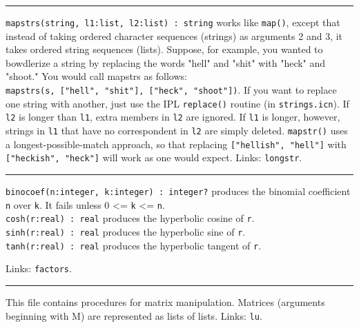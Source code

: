 \vspace{0.25cm}\hrule{}

\texttt{mapstrs(string, l1:list, l2:list) : string} works like
\texttt{map()}, except that instead of taking ordered character
sequences (strings) as arguments 2 and 3, it takes ordered string
sequences (lists). Suppose, for example, you wanted to
bowdlerize a string by replacing the words
"hell" and
"shit" with
"heck" and
"shoot." You would call mapstrs as
follows:\\
\texttt{mapstrs(s, ["hell",
"shit"],
["heck",
"shoot"])}. If you want to replace one
string with another, just use the IPL \texttt{replace()} routine (in
\texttt{strings.icn}). If \texttt{l2} is longer than \texttt{l1}, extra
members in \texttt{l2} are ignored. If \texttt{l1} is longer, however,
strings in \texttt{l1} that have no correspondent in \texttt{l2} are
simply deleted. \texttt{mapstr()} uses a longest-possible-match
approach, so that replacing
\texttt{["hellish",
"hell"]} with
\texttt{["heckish",
"heck"]} will work as one would expect.
Links: \texttt{longstr}.

\vspace{0.25cm}\hrule{}

\texttt{binocoef(n:integer, k:integer) : integer?} produces the
binomial coefficient \texttt{n} over
\texttt{k}. It fails unless 0 {\textless}= \texttt{k} {\textless}=
\texttt{n}.\\
\texttt{cosh(r:real) : real} produces the hyperbolic cosine of \texttt{r}.\\
\texttt{sinh(r:real) : real} produces the hyperbolic sine of
\texttt{r}.\\
\texttt{tanh(r:real) : real} produces the hyperbolic tangent of
\texttt{r}.

Links: \texttt{factors}.

\vspace{0.25cm}\hrule{}

This file contains procedures for matrix
manipulation. Matrices (arguments beginning with M) are represented as
lists of lists. Links: \texttt{lu}.

